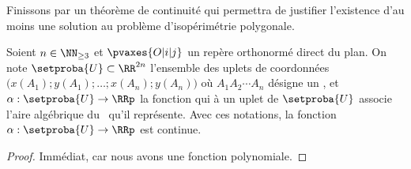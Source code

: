 

Finissons par un théorème de continuité qui permettra de justifier l'existence d'au moins une solution au problème d'isopérimétrie polygonale.


\begin{fact} \label{sarea-cont}
    Soient $n \in \NN_{\geq3}$ et
    $\pvaxes{O | i | j}$ un repère orthonormé direct du plan.
    On note $\setproba{U} \subset \RR^{2n}$ l'ensemble des uplets de coordonnées $\big( x(A_1) ; y(A_1) ; \dots ; x(A_n) ; y(A_n) \big)$ où $A_1 A_2 \cdots A_n$ désigne un \ncycle,
    et $\alpha: \setproba{U} \rightarrow \RRp$ la fonction qui à un uplet de $\setproba{U}$ associe l'aire algébrique du \ncycle\ qu'il représente.
    Avec ces notations, la fonction $\alpha: \setproba{U} \rightarrow \RRp$ est continue.
\end{fact}


\begin{proof}
    Immédiat, car nous avons une fonction polynomiale.
\end{proof}
